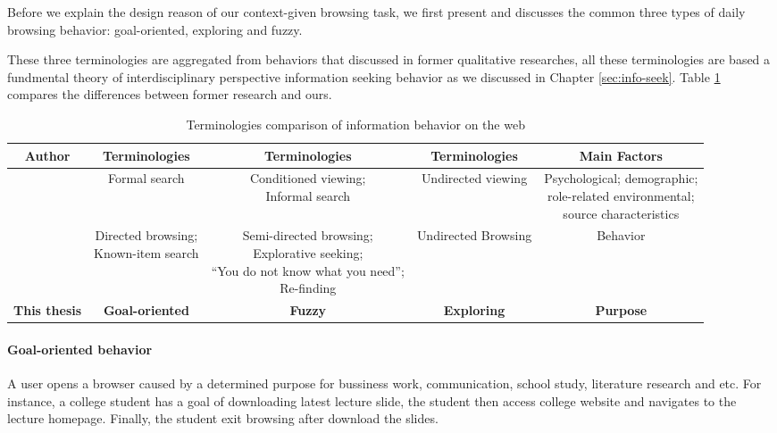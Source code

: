 Before we explain the design reason of our context-given browsing task, we first present
and discusses the common three types of daily browsing behavior: goal-oriented, exploring and fuzzy.

These three terminologies are aggregated from behaviors that discussed in former qualitative researches, all these terminologies are based a fundmental theory of interdisciplinary perspective information seeking behavior \cite{wilson1997information} as we discussed in Chapter \ref{sec:info-seek}.
Table \ref{table:info-seek} compares the differences between former research and ours.

\begin{table}[H]
    \small
    \centering
    \caption{Terminologies comparison of information behavior on the web}
    \begin{adjustbox}{width=\textwidth}
        \begin{tabular}{ccccc}
            \toprule
            \textbf{Author} & \textbf{Terminologies} & \textbf{Terminologies} & \textbf{Terminologies} & \textbf{Main Factors} \\
            \hline
            \cite{choo1999information} & Formal search & \makecell{Conditioned viewing; \\ Informal search} & Undirected viewing & \makecell{Psychological; demographic;\\ role-related environmental; \\source characteristics} \\
            \cite{johnson2017patterns} & \makecell{Directed browsing; \\Known-item search} & \makecell{Semi-directed browsing; \\Explorative seeking; \\``You do not know what you need''; \\Re-finding} & Undirected Browsing & Behavior \\
            \textbf{This thesis} & \textbf{Goal-oriented} & \textbf{Fuzzy} & \textbf{Exploring} & \textbf{Purpose} \\
            \bottomrule
        \end{tabular}
        \label{table:info-seek}
    \end{adjustbox}
\end{table}

\paragraph{Goal-oriented behavior} A user opens a browser caused by a determined purpose for bussiness work, communication,
school study, literature research and etc.
For instance, a college student has a goal of downloading latest lecture slide, the student then
access college website and navigates to the lecture homepage. Finally, the student exit 
browsing after download the slides.

